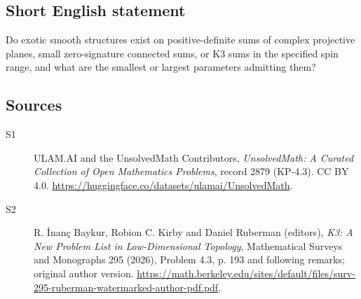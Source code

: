 \documentclass[11pt]{article}
\begin{document}
\subsection{Short English statement}
Do exotic smooth structures exist on positive-definite sums of complex projective planes, small zero-signature connected sums, or K3 sums in the specified spin range, and what are the smallest or largest parameters admitting them?
\subsection{Sources}
\begin{description}
\item[\hypertarget{source:2879:1}{S1}] ULAM.AI and the UnsolvedMath Contributors, \emph{UnsolvedMath: A Curated Collection of Open Mathematics Problems}, record 2879 (KP-4.3). CC BY 4.0. \url{https://huggingface.co/datasets/ulamai/UnsolvedMath}.
\item[\hypertarget{source:2879:2}{S2}] R. İnanç Baykur, Robion C. Kirby and Daniel Ruberman (editors), \emph{K3: A New Problem List in Low-Dimensional Topology}, Mathematical Surveys and Monographs 295 (2026), Problem 4.3, p. 193 and following remarks; original author version. \url{https://math.berkeley.edu/sites/default/files/surv-295-ruberman-watermarked-author-pdf.pdf}.
\end{description}
\label{end:2879}
\end{document}
